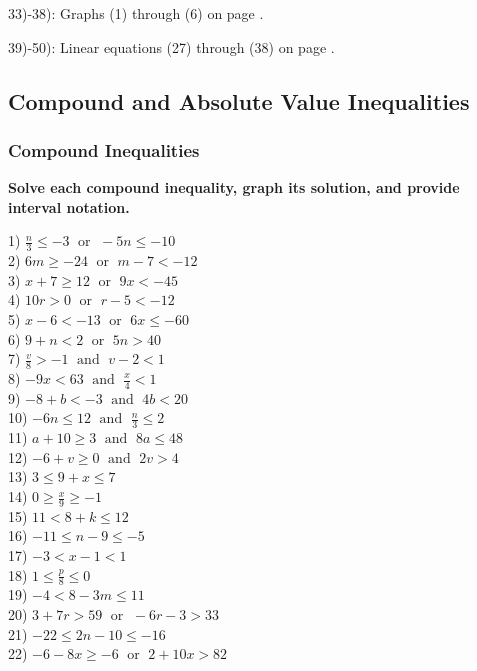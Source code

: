 \documentclass[12pt]{book}
\theoremstyle{definition}
\newcommand{\tmop}[1]{\ensuremath{\operatorname{#1}}}
\begin{document}
33)-38): Graphs (1) through (6) on page \pageref{lineargraphs1}.\par

39)-50): Linear equations (27) through (38) on page \pageref{lineargraphs2}.

\subsection*{Compound and Absolute Value Inequalities}
\subsubsection*{Compound Inequalities}
{\bf Solve each compound inequality, graph its solution, and provide interval notation.}
\begin{multicols}{2}
  1) $\frac{n}{3} \leq - 3 \tmop{~or~} - 5 n \leq - 10$\\
  2) $6 m \geq - 24 \tmop{~or~} m - 7 < - 12$\\
  3) $x + 7 \geq 12 \tmop{~or~} 9 x < - 45$\\
  4) $10 r > 0 \tmop{~or~} r - 5 < - 12$\\
  5) $x - 6 < - 13 \tmop{~or~} 6 x \leq - 60$\\
  6) $9 + n < 2 \tmop{~or~} 5 n > 40$\\
  7) $\frac{v}{8} > - 1 \tmop{~and~} v - 2 < 1$\\
  8) $- 9 x < 63 \tmop{~and~} \frac{x}{4} < 1$\\
  9) $- 8 + b < - 3 \tmop{~and~} 4 b < 20$\\
  10) $- 6 n \leq 12 \tmop{~and~} \frac{n}{3} \leq 2$\\
  11) $a + 10 \geq 3 \tmop{~and~} 8 a \leq 48$\\
  12) $- 6 + v \geq 0 \tmop{~and~} 2 v > 4$\\
  13) $3 \leq 9 + x \leq 7$\\
  14) $0 \geq \frac{x}{9} \geq - 1$\\
  15) $11 < 8 + k \leq 12$\\
  16) $- 11 \leq n - 9 \leq - 5$\\
  17) $- 3 < x - 1 < 1$\\
  18) $1 \leq \frac{p}{8} \leq 0$\\
  19) $- 4 < 8 - 3 m \leq 11$\\
  20) $3 + 7 r > 59 \tmop{~or~} - 6 r - 3 > 33$\\
  21) $- 22 \leq 2 n - 10 \leq - 16$\\
  22) $- 6 - 8 x \geq - 6 \tmop{~or~} 2 + 10 x > 82$
\end{multicols}
\end{document}
